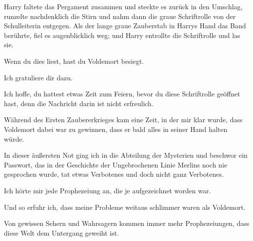 \later

Harry faltete das Pergament zusammen und steckte es zurück in den Umschlag, runzelte nachdenklich die Stirn und nahm dann die graue Schriftrolle von der Schulleiterin entgegen. Als der lange graue Zauberstab in Harrys Hand das Band berührte, fiel es augenblicklich weg; und Harry entrollte die Schriftrolle und las sie.

\later

\begin{writtenNote}
Wenn du dies liest, hast du Voldemort besiegt.

Ich gratuliere dir dazu.

Ich hoffe, du hattest etwas Zeit zum Feiern, bevor du diese Schriftrolle geöffnet hast, denn die Nachricht darin ist nicht erfreulich.

Während des Ersten Zaubererkrieges kam eine Zeit, in der mir klar wurde, dass Voldemort dabei war zu gewinnen, dass er bald alles in seiner Hand halten würde.

In dieser äußersten Not ging ich in die Abteilung der Mysterien und beschwor ein Passwort, das in der Geschichte der Ungebrochenen Linie Merlins noch nie gesprochen wurde, tat etwas Verbotenes und doch nicht ganz Verbotenes.

Ich hörte mir jede Prophezeiung an, die je aufgezeichnet worden war.

Und so erfuhr ich, dass meine Probleme weitaus schlimmer waren als Voldemort.

Von gewissen Sehern und Wahrsagern kommen immer mehr Prophezeiungen, dass diese Welt dem Untergang geweiht ist.


\end{writtenNote}
